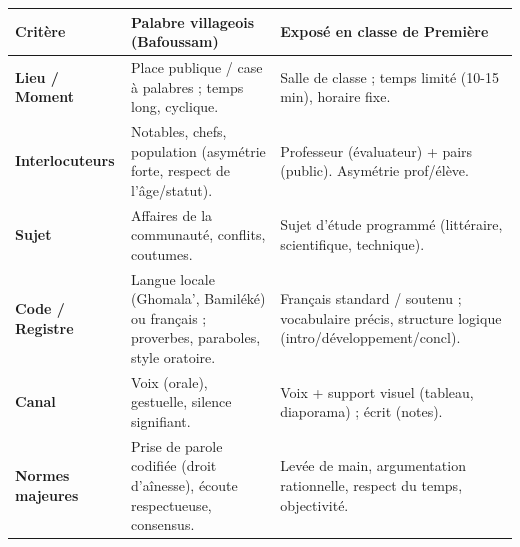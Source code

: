 \documentclass[11pt]{article}
\begin{document}
\begin{exemplebox}
\begin{center}
\begin{tabularx}{\linewidth}{|l|X|X|}\hline
\rowcolor{poporangeL}
\textbf{Critère} & \textbf{Palabre villageois (Bafoussam)} & \textbf{Exposé en classe de Première} \\ \hline
\textbf{Lieu / Moment} & Place publique / case à palabres ; temps long, cyclique. & Salle de classe ; temps limité (10-15 min), horaire fixe. \\ \hline
\textbf{Interlocuteurs} & Notables, chefs, population (asymétrie forte, respect de l'âge/statut). & Professeur (évaluateur) + pairs (public). Asymétrie prof/élève. \\ \hline
\textbf{Sujet} & Affaires de la communauté, conflits, coutumes. & Sujet d'étude programmé (littéraire, scientifique, technique). \\ \hline
\textbf{Code / Registre} & Langue locale (Ghomala', Bamiléké) ou français ; proverbes, paraboles, style oratoire. & Français standard / soutenu ; vocabulaire précis, structure logique (intro/développement/concl). \\ \hline
\textbf{Canal} & Voix (orale), gestuelle, silence signifiant. & Voix + support visuel (tableau, diaporama) ; écrit (notes). \\ \hline
\textbf{Normes majeures} & Prise de parole codifiée (droit d'aînesse), écoute respectueuse, consensus. & Levée de main, argumentation rationnelle, respect du temps, objectivité. \\ \hline
\end{tabularx}
\end{center}
\end{exemplebox}
\end{document}
